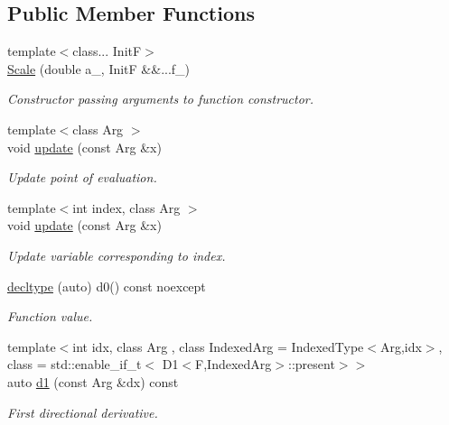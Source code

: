 \subsection*{\-Public \-Member \-Functions}
\begin{DoxyCompactItemize}
\item 
{\footnotesize template$<$class... \-Init\-F$>$ }\\\hyperlink{structFunG_1_1MathematicalOperations_1_1Scale_a10c61b696b4777db7d5c53b4a96b210a}{\-Scale} (double a\-\_\-, \-Init\-F \&\&...f\-\_\-)
\begin{DoxyCompactList}\small\item\em \-Constructor passing arguments to function constructor. \end{DoxyCompactList}\item 
{\footnotesize template$<$class Arg $>$ }\\void \hyperlink{structFunG_1_1MathematicalOperations_1_1Scale_a78bbb512333a17c72928d3f21de63dee}{update} (const \-Arg \&x)
\begin{DoxyCompactList}\small\item\em \-Update point of evaluation. \end{DoxyCompactList}\item 
{\footnotesize template$<$int index, class Arg $>$ }\\void \hyperlink{structFunG_1_1MathematicalOperations_1_1Scale_a49b277539bf6582956f68d325ce4a44d}{update} (const \-Arg \&x)
\begin{DoxyCompactList}\small\item\em \-Update variable corresponding to index. \end{DoxyCompactList}\item 
\hyperlink{structFunG_1_1MathematicalOperations_1_1Scale_a5ba9ecc77459d685d097a1133a61e79d}{decltype} (auto) d0() const noexcept
\begin{DoxyCompactList}\small\item\em \-Function value. \end{DoxyCompactList}\item 
{\footnotesize template$<$int idx, class Arg , class Indexed\-Arg  = \-Indexed\-Type$<$\-Arg,idx$>$, class  = std\-::enable\-\_\-if\-\_\-t$<$ D1$<$\-F,\-Indexed\-Arg$>$\-::present$>$$>$ }\\auto \hyperlink{structFunG_1_1MathematicalOperations_1_1Scale_aa917dfae80d3682fdbbe1e1c8214c503}{d1} (const \-Arg \&dx) const 
\begin{DoxyCompactList}\small\item\em \-First directional derivative. \end{DoxyCompactList}\item 

\end{DoxyCompactItemize}
